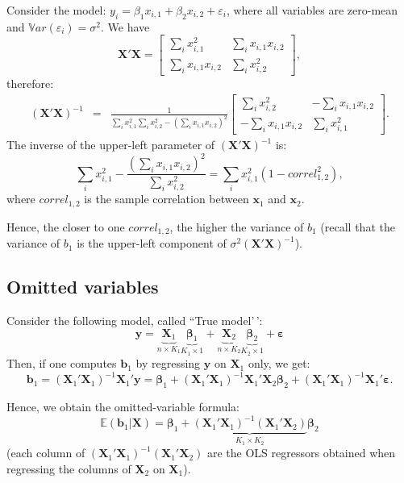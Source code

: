 \documentclass[
]{book}
\theoremstyle{definition}
\theoremstyle{definition}
\theoremstyle{definition}
\theoremstyle{definition}
\theoremstyle{remark}
\begin{document}
Consider the model: \(y_i = \beta_1 x_{i,1} + \beta_2 x_{i,2} + \varepsilon_i\), where all variables are zero-mean and \(\mathbb{V}ar(\varepsilon_i)=\sigma^2\). We have
\[
\mathbf{X}'\mathbf{X} = \left[ \begin{array}{cc}
\sum_i x_{i,1}^2 & \sum_i x_{i,1} x_{i,2} \\
\sum_i x_{i,1} x_{i,2} & \sum_i x_{i,2}^2
\end{array}\right],
\]
therefore:
\begin{eqnarray*}
(\mathbf{X}'\mathbf{X})^{-1} &=& \frac{1}{\sum_i x_{i,1}^2\sum_i x_{i,2}^2 - (\sum_i x_{i,1} x_{i,2})^2} \left[ \begin{array}{cc}
\sum_i x_{i,2}^2 & -\sum_i x_{i,1} x_{i,2} \\
-\sum_i x_{i,1} x_{i,2} & \sum_i x_{i,1}^2
\end{array}\right].
\end{eqnarray*}
The inverse of the upper-left parameter of \((\mathbf{X}'\mathbf{X})^{-1}\) is:
\begin{equation}
\sum_i x_{i,1}^2 - \frac{(\sum_i x_{i,1} x_{i,2})^2}{\sum_i x_{i,2}^2} = \sum_i x_{i,1}^2(1 - correl_{1,2}^2),\label{eq:multicollin}
\end{equation}
where \(correl_{1,2}\) is the sample correlation between \(\mathbf{x}_{1}\) and \(\mathbf{x}_{2}\).

Hence, the closer to one \(correl_{1,2}\), the higher the variance of \(b_1\) (recall that the variance of \(b_1\) is the upper-left component of \(\sigma^2(\mathbf{X}'\mathbf{X})^{-1}\)).

\hypertarget{omitted-variables}{%
\subsection{Omitted variables}\label{omitted-variables}}

Consider the following model, called ``True model'\,':
\[
\mathbf{y} = \underbrace{\mathbf{X}_1}_{n \times K_1}\underbrace{\boldsymbol\beta_1}_{K_1 \times 1} + \underbrace{\mathbf{X}_2}_{n\times K_2}\underbrace{\boldsymbol\beta_2}_{K_2 \times 1} + \boldsymbol\varepsilon
\]
Then, if one computes \(\mathbf{b}_1\) by regressing \(\mathbf{y}\) on \(\mathbf{X}_1\) only, we get:
\[
\mathbf{b}_1 = (\mathbf{X}_1'\mathbf{X}_1)^{-1}\mathbf{X}_1'\mathbf{y} = \boldsymbol\beta_1 + (\mathbf{X}_1'\mathbf{X}_1)^{-1}\mathbf{X}_1'\mathbf{X}_2\boldsymbol\beta_2 + 
(\mathbf{X}_1'\mathbf{X}_1)^{-1}\mathbf{X}_1'\boldsymbol\varepsilon.
\]

Hence, we obtain the omitted-variable formula:
\[
\boxed{\mathbb{E}(\mathbf{b}_1|\mathbf{X}) = \boldsymbol\beta_1 + \underbrace{(\mathbf{X}_1'\mathbf{X}_1)^{-1}(\mathbf{X}_1'\mathbf{X}_2)}_{K_1 \times K_2}\boldsymbol\beta_2}
\]
(each column of \((\mathbf{X}_1'\mathbf{X}_1)^{-1}(\mathbf{X}_1'\mathbf{X}_2)\) are the OLS regressors obtained when regressing the columns of \(\mathbf{X}_2\) on \(\mathbf{X}_1\)).
\end{document}

